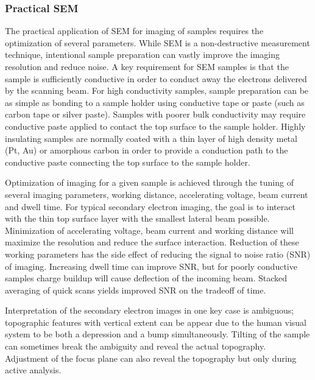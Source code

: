 \subsubsection{Practical SEM} The practical application of SEM for imaging of samples requires the optimization of several parameters.
While SEM is a non-destructive measurement technique, intentional sample preparation can vastly improve the imaging resolution and reduce noise.
A key requirement for SEM samples is that the sample is sufficiently conductive in order to conduct away the electrons delivered by the scanning beam.
For high conductivity samples, sample preparation can be as simple as bonding to a sample holder using conductive tape or paste (such as carbon tape or silver paste).
Samples with poorer bulk conductivity may require conductive paste applied to contact the top surface to the sample holder.
Highly insulating samples are normally coated with a thin layer of high density metal (Pt, Au) or amorphous carbon in order to provide a conduction path to the conductive paste connecting the top surface to the sample holder.

Optimization of imaging for a given sample is achieved through the tuning of several imaging parameters, working distance, accelerating voltage, beam current and dwell time\cite{goldstein2003scanning}.
For typical secondary electron imaging, the goal is to interact with the thin top surface layer with the smallest lateral beam possible.
Minimization of accelerating voltage, beam current and working distance will maximize the resolution and reduce the surface interaction.
Reduction of these working parameters has the side effect of reducing the signal to noise ratio (SNR) of imaging.
Increasing dwell time can improve SNR, but for poorly conductive samples charge buildup will cause deflection of the incoming beam.
Stacked averaging of quick scans yields improved SNR on the tradeoff of time.

Interpretation of the secondary electron images in one key case is ambiguous; topographic features with vertical extent can be appear due to the human visual system to be both a depression and a bump simultaneously.
Tilting of the sample can sometimes break the ambiguity and reveal the actual topography.
Adjustment of the focus plane can also reveal the topography but only during active analysis.

